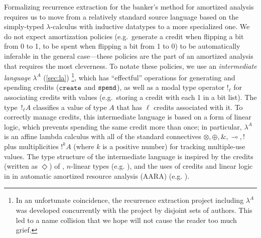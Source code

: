 Formalizing recurrence extraction for the banker's method for amortized
analysis requires us to move
from a relatively standard source language based on the simply-typed
$\lambda$-calculus with inductive datatypes to a more specialized one.
We do not expect amortization policies (e.g.\ generate a credit when
flipping a bit from 0 to 1, to be spent when flipping a bit from 1 to 0)
to be automatically inferable in the general case---these policies are the part
of an amortized analysis that requires the most cleverness.  To notate
these policies, we use an \emph{intermediate language} $\lambda^A$
(\autoref{sec:la}) \footnote{
In an unfortunate coincidence, the recurrence extraction project including $\lambda^A$ was developed concurrently with the \lambdaamor project by disjoint sets of authors. This led to a name collision that we hope will not cause the reader too much grief.
}, which has ``effectful'' operations for
generating and spending credits ($\texttt{create}$ and $\texttt{spend}$), as well
as a modal type operator $!_\ell$ for associating credits with values
(e.g.\ storing a credit with each 1 in a bit list).  The type~$!_\ell A$
classifies a value of type $A$ that has $\ell$ credits associated with
it.  To correctly manage credits, this intermediate language is based on
a form of linear logic, which prevents spending the same credit more
than once; in particular, $\lambda^A$ is an affine lambda calculus with
all of the standard connectives $\otimes, \oplus, \&, \multimap, !$ plus
multiplicities $!^k A$ (where $k$ is a positive number) for tracking
multiple-use values.  The type structure of the intermediate language is
inspired by the credits (written as $\Diamond$) of
\cite{hofmann02diamonds,hofmann03diamonds-journal}, $n$-linear types
(e.g. \cite{girard-et-al:tcs92:bll,reed:names-useless,mcbride:plenty-o-nuttin,atkey:lics18}),
and the uses of credits and linear logic in in automatic amortized
resource analysis (AARA)
(e.g. \cite{hofmannjost03aara,hoffmann-et-al:toplas12:multivariate-amortized,knoth+19resourceguided}).

